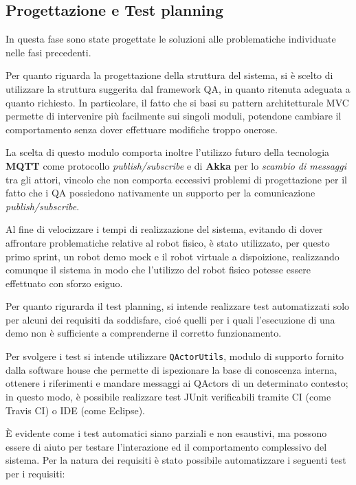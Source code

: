 

\subsection{Progettazione e Test planning}

In questa fase sono state progettate le soluzioni alle problematiche individuate nelle fasi precedenti.

Per quanto riguarda la progettazione della struttura del sistema, si è scelto di utilizzare la struttura suggerita dal framework QA, in quanto ritenuta adeguata a quanto richiesto.
In particolare, il fatto che si basi su pattern architetturale MVC permette di intervenire più facilmente sui singoli moduli, potendone cambiare il comportamento senza dover effettuare modifiche troppo onerose.

La scelta di questo modulo comporta inoltre l'utilizzo futuro della tecnologia \textbf{MQTT} come protocollo \textit{publish/subscribe} e di \textbf{Akka} per lo \textit{scambio di messaggi} tra gli attori,
vincolo che non comporta eccessivi problemi di progettazione per il fatto che i QA possiedono nativamente un supporto per la comunicazione \textit{publish/subscribe}.

Al fine di velocizzare i tempi di realizzazione del sistema, evitando di dover affrontare problematiche relative al robot fisico,
è stato utilizzato, per questo primo sprint, un robot demo mock e il robot virtuale a dispoizione, realizzando comunque il sistema in modo che l'utilizzo del robot fisico potesse essere effettuato con sforzo esiguo.

Per quanto rigurarda il test planning, si intende realizzare test automatizzati solo per alcuni dei requisiti da soddisfare, cioé quelli per i quali l'esecuzione di una demo non è sufficiente a comprenderne il corretto funzionamento.

Per svolgere i test si intende utilizzare \texttt{QActorUtils}, modulo di supporto fornito dalla software house che permette di ispezionare la base di conoscenza interna, ottenere i riferimenti e mandare messaggi ai QActors di un determinato contesto;
in questo modo, è possibile realizzare test JUnit verificabili tramite CI (come Travis CI) o IDE (come Eclipse).

È evidente come i test automatici siano parziali e non esaustivi, ma possono essere di aiuto per testare l'interazione ed il comportamento complessivo del sistema.
Per la natura dei requisiti è stato possibile automatizzare i seguenti test per i requisiti:


